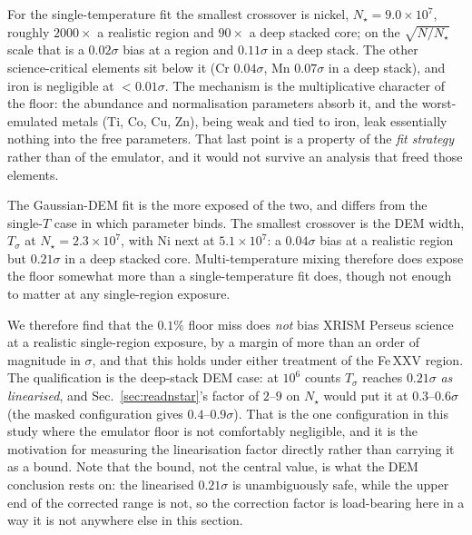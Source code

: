 \documentclass[11pt,a4paper]{article}
\begin{document}
For the single-temperature fit the smallest crossover is nickel,
$N_\star=9.0\times10^7$, roughly $2000\times$ a realistic region and
$90\times$ a deep stacked core; on the $\sqrt{N/N_\star}$ scale that is a
$0.02\sigma$ bias at a region and $0.11\sigma$ in a deep stack. The other
science-critical elements sit below it (Cr $0.04\sigma$, Mn $0.07\sigma$ in a
deep stack), and iron is negligible at $<0.01\sigma$. The mechanism is the
multiplicative character of the floor: the abundance and normalisation
parameters absorb it, and the worst-emulated metals (Ti, Co, Cu, Zn), being
weak and tied to iron, leak essentially nothing into the free parameters. That
last point is a property of the \emph{fit strategy} rather than of the
emulator, and it would not survive an analysis that freed those elements.

The Gaussian-DEM fit is the more exposed of the two, and differs from the
single-$T$ case in which parameter binds. The smallest crossover is the DEM
width, $T_\sigma$ at $N_\star=2.3\times10^7$, with Ni next at
$5.1\times10^7$: a $0.04\sigma$ bias at a realistic region but $0.21\sigma$ in
a deep stacked core. Multi-temperature mixing therefore does expose the floor
somewhat more than a single-temperature fit does, though not enough to matter at
any single-region exposure.

We therefore find that the $0.1\%$ floor miss does \emph{not} bias XRISM Perseus
science at a realistic single-region exposure, by a margin of more than an order
of magnitude in $\sigma$, and that this holds under either treatment of the
Fe\,XXV region. The qualification is the deep-stack DEM case: at $10^6$ counts
$T_\sigma$ reaches $0.21\sigma$ \emph{as linearised}, and
Sec.~\ref{sec:readnstar}'s factor of $2$--$9$ on $N_\star$ would put it at
$0.3$--$0.6\sigma$ (the masked configuration gives $0.4$--$0.9\sigma$). That is
the one configuration in this study where the emulator floor is not comfortably
negligible, and it is the motivation for measuring the linearisation factor
directly rather than carrying it as a bound. Note that the bound, not the
central value, is what the DEM conclusion rests on: the linearised
$0.21\sigma$ is unambiguously safe, while the upper end of the corrected range
is not, so the correction factor is load-bearing here in a way it is not
anywhere else in this section.
\end{document}
